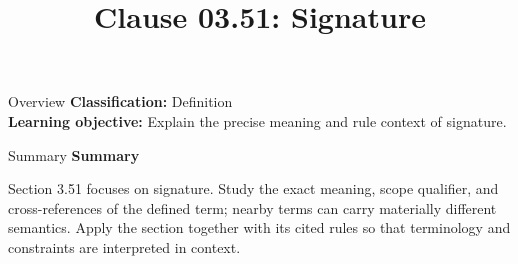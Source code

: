 \documentclass[10pt,letterpaper]{article}
\title{Clause 03.51: Signature}
\author{}
\date{}
\begin{document}
\maketitle
\begin{CornellOverviewBox}{Overview}
\textbf{Classification:} Definition\\[2pt]
\textbf{Learning objective:} Explain the precise meaning and rule context of signature.
\end{CornellOverviewBox}\begin{CornellSummaryBox}{Summary}
{\sffamily\bfseries\color{Accent} Summary}\par\vspace{3pt}Section 3.51 focuses on signature. Study the exact meaning, scope qualifier, and cross-references of the defined term; nearby terms can carry materially different semantics. Apply the section together with its cited rules so that terminology and constraints are interpreted in context.
\end{CornellSummaryBox}
\end{document}
